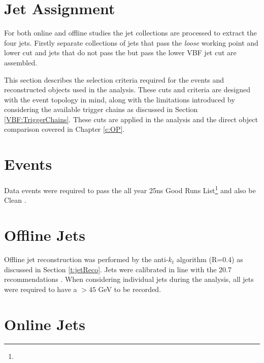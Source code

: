 	\section{Jet Assignment}

		For both online and offline studies the jet collections are processed to extract the four \VBFHBB jets. Firstly separate collections of jets that pass the \textit{loose} \btag working point and lower \bjet \pt cut and jets that do not pass the \btag but pass the lower VBF jet cut are assembled.


This section describes the selection criteria required for the events and reconstructed objects used in the analysis. These cuts and criteria are designed with the \VBFHBB event topology in mind, along with the limitations introduced by considering the available trigger chains as discussed in Section \ref{VBF:TriggerChains}. These cuts are applied in the \VBFHBB analysis and the direct object comparison covered in Chapter \ref{c:OP}.

\section{Events}

Data events were required to pass the all year 25ns Good Runs List\footnote{}  and also be Clean .

\section{Offline Jets}

	Offline jet reconstruction was performed by the anti-$k_t$ algorithm (R=0.4) as discussed in Section \ref{t:jetReco}. Jets were calibrated in line with the 20.7 recommendations . When considering individual jets during the analysis, all jets were required to have a \pt $> 45$ GeV to be recorded.

\section{Online Jets}

